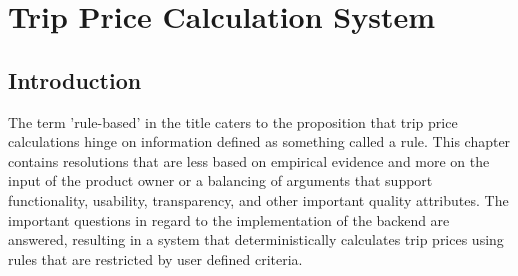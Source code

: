 \graphicspath{{Chapter4/Figs/Vector/}{Chapter4/Figs/}}

\chapter{Trip Price Calculation System}
\section{Introduction}
The term 'rule-based' in the title caters to the proposition that trip price calculations hinge on information defined as something called a rule. This chapter contains resolutions that are less based on empirical evidence and more on the input of the product owner or a balancing of arguments that support functionality, usability, transparency, and other important quality attributes. The important questions in regard to the implementation of the backend are answered, resulting in a system that deterministically calculates trip prices using rules that are restricted by user defined criteria.

